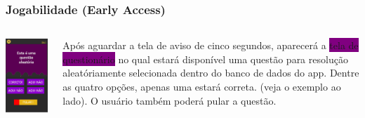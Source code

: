 \documentclass[10pt]{beamer}
\begin{document}

\begin{frame}
\frametitle{Jogabilidade (Early Access)}


\begin{columns}
	
	\includegraphics[width=0.9\linewidth, height=0.9\textheight,keepaspectratio=false]{questao_random.PNG} \pause	
	
	
	
	
Após aguardar a tela de aviso de cinco segundos, aparecerá a \colorbox{purple}{tela de questionário} no qual estará disponível uma questão para resolução aleatóriamente selecionada dentro do banco de dados do app. Dentre as quatro opções, apenas uma estará correta. (veja o exemplo ao lado). O usuário também poderá pular a questão. 
	
\end{columns}  
\end{frame}
\end{document}
